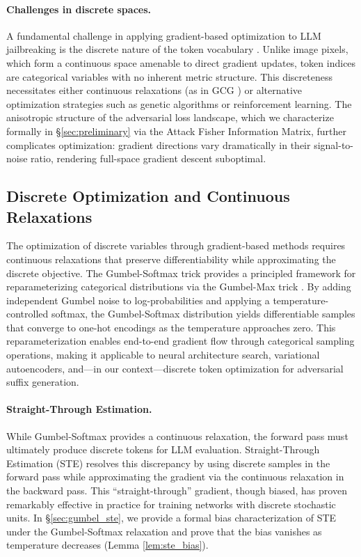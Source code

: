 \documentclass[preprint,12pt]{elsarticle}
\begin{document}
\paragraph{Challenges in discrete spaces.} A fundamental challenge in applying gradient-based optimization to LLM jailbreaking is the discrete nature of the token vocabulary \cite{chen2023gradient_optimization_zdhx}. Unlike image pixels, which form a continuous space amenable to direct gradient updates, token indices are categorical variables with no inherent metric structure. This discreteness necessitates either continuous relaxations (as in GCG \cite{zou2023universal}) or alternative optimization strategies such as genetic algorithms or reinforcement learning. The anisotropic structure of the adversarial loss landscape, which we characterize formally in \S\ref{sec:preliminary} via the Attack Fisher Information Matrix, further complicates optimization: gradient directions vary dramatically in their signal-to-noise ratio, rendering full-space gradient descent suboptimal.

\subsection{Discrete Optimization and Continuous Relaxations}
\label{sec:rw_discrete}

The optimization of discrete variables through gradient-based methods requires continuous relaxations that preserve differentiability while approximating the discrete objective. The Gumbel-Softmax trick \cite{jang2017categorical, maddison2017concrete} provides a principled framework for reparameterizing categorical distributions via the Gumbel-Max trick \cite{gumbel1954statistical}. By adding independent Gumbel noise to log-probabilities and applying a temperature-controlled softmax, the Gumbel-Softmax distribution yields differentiable samples that converge to one-hot encodings as the temperature approaches zero. This reparameterization enables end-to-end gradient flow through categorical sampling operations, making it applicable to neural architecture search, variational autoencoders, and---in our context---discrete token optimization for adversarial suffix generation.

\paragraph{Straight-Through Estimation.} While Gumbel-Softmax provides a continuous relaxation, the forward pass must ultimately produce discrete tokens for LLM evaluation. Straight-Through Estimation (STE) \cite{bengio2013estimating} resolves this discrepancy by using discrete samples in the forward pass while approximating the gradient via the continuous relaxation in the backward pass. This ``straight-through'' gradient, though biased, has proven remarkably effective in practice for training networks with discrete stochastic units. In \S\ref{sec:gumbel_ste}, we provide a formal bias characterization of STE under the Gumbel-Softmax relaxation and prove that the bias vanishes as temperature decreases (Lemma \ref{lem:ste_bias}).
\end{document}

